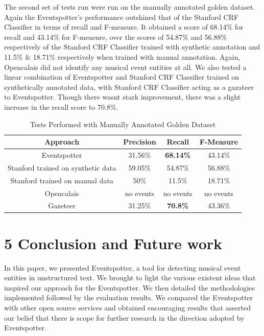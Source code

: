 \documentclass[a4paper,11pt]{report}
\begin{document}
The second set of tests run were run on the manually annotated golden dataset. Again the Eventspotter's performance outshined that of the Stanford CRF Classifier in terms of recall and F-measure. It obtained a score of 68.14\% for recall and 43.14\% for F-measure, over the scores of 54.87\% and 56.88\% respectively of the Stanford CRF Classifier trained with synthetic annotation and 11.5\% & 18.71\% respectively when trained with manual annotation. Again, Opencalais did not identify any musical event entities at all. We also tested a linear combination of Eventspotter and Stanford CRF Classifier trained on synthetically annotated data, with Stanford CRF Classifier acting as a gazateer to Eventspotter. Though there wasnt stark improvement, there was a slight increase in the recall score to 70.8\%. 
\begin{table}[ht]
\caption{Tests Performed with Manually Annotated Golden Dataset} %
\centering %
\begin{tabular}{c c c c} %
\hline\hline %
Approach & Precision & Recall & F-Measure \\ [0.5ex] %
\hline %
Eventspotter & 31.56\% & \bf 68.14\% \bf & 43.14\% \\
Stanford trained on synthetic data  & 59.05\% & 54.87\% & 56.88\%\\
Stanford trained on manual data & 50\% & 11.5\% & 18.71\%  \\
Opencalais & no events & no events & no events \\
Gazeteer & 31.25\% & \bf 70.8\% \bf & 43.36\% \\
\hline %
\end{tabular}
\label{table:nonlin} %
\end{table}











\chapter*{5 Conclusion and Future work}

In this paper, we presented Eventspotter, a tool for detecting musical event entities in unstructured text. We brought to light the various existent ideas that inspired our approach for the Eventspotter. We then detailed the methodologies implemented followed by the evaluation results. We compared the Eventspotter with other open source services and obtained encouraging results that asserted our belief that there is scope for further research in the direction adopted by Eventspotter.  
\end{document}

